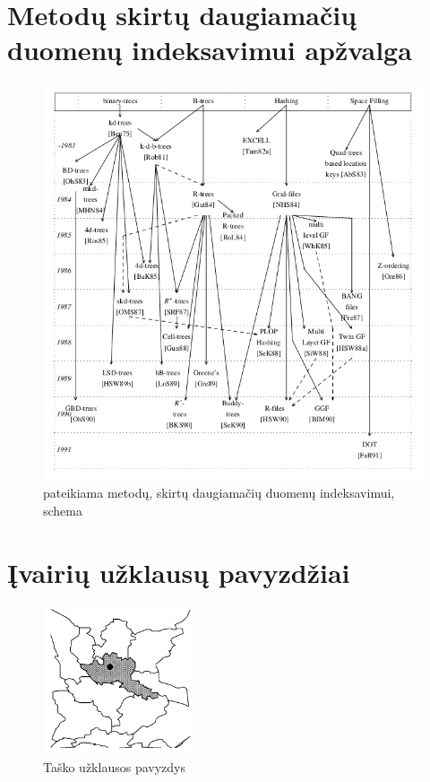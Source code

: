 \appendix

\section{Metodų skirtų daugiamačių duomenų indeksavimui apžvalga}
\label{app:multidimensionalIndexing}
\begin{figure}[H]
\begin{center}
\includegraphics[width=\textwidth]{img/MultidimensionalDataIndexing.png}
\caption{\cite{bader2012space} pateikiama metodų, skirtų daugiamačių duomenų indeksavimui, schema}
\end{center}
\end{figure}

\section{Įvairių užklausų pavyzdžiai}

\label{app:pointQuery}
\begin{figure}[H]
\begin{center}
\includegraphics[width=0.4\textwidth]{img/PointQuery.png}
\caption{Taško užklausos pavyzdys}
\end{center}
\end{figure}

